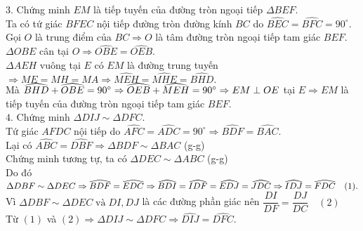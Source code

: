 \begin{ex}
{{{}}
		 \vskip0.1cm\noindent$3.$ Chứng minh $EM$ là tiếp tuyến của đường tròn ngoại tiếp $\Delta BEF.$\\
		 Ta có tứ giác $BFEC$ nội tiếp đường tròn đường kính $BC$ do $\widehat{BEC}=\widehat{BFC}=90^\circ.$\\
		 Gọi $O$ là trung điểm của $BC\Rightarrow O$ là tâm đường tròn ngoại tiếp tam giác $BEF$.\\
		 $\Delta OBE$ cân tại $O\Rightarrow\widehat{OBE}=\widehat{OEB}.$\\
		  $\Delta AEH$ vuông tại $E$ có $EM$ là đường trung tuyến\\
		  $\Rightarrow ME=MH=MA\Rightarrow\widehat{MEH}=\widehat{MHE}=\widehat{BHD}.$\\
		  Mà $\widehat{BHD}+\widehat{OBE}=90^\circ\Rightarrow \widehat{OEB}+\widehat{MEH}=90^\circ\\\Rightarrow EM\perp OE$ tại $E\Rightarrow EM$ là tiếp tuyến của đường tròn ngoại tiếp tam giác $BEF.$ \\
		  \noindent$4.$ Chứng minh $\Delta DIJ\sim \Delta DFC.$\\
		  Tứ giác $AFDC$ nội tiếp do $\widehat{AFC}=\widehat{ADC}=90^\circ\Rightarrow\widehat{BDF}=\widehat{BAC}.$ \\Lại có $\widehat{ABC}=\widehat{DBF}\Rightarrow \Delta BDF\sim \Delta BAC$ (g-g)\\
		  Chứng minh tương tự, ta có $\Delta DEC\sim\Delta ABC$ (g-g)\\
		  Do đó $\Delta DBF\sim \Delta DEC\Rightarrow\widehat{BDF}=\widehat{EDC}\\\Rightarrow\widehat{BDI}=\widehat{IDF}=\widehat{EDJ}=\widehat{JDC}\Rightarrow\widehat{IDJ}=\widehat{FDC}\quad (1).$\\
		  Vì $\Delta DBF\sim \Delta DEC\;
		  \text{và}\; DI,DJ$  là các đường phần giác nên $\dfrac{DI}{DF}=\dfrac{DJ}{DC}\quad (2)$\\
		  Từ $(1)$ và $(2)\Rightarrow \Delta DIJ\sim \Delta DFC\Rightarrow\widehat{DIJ}=\widehat{DFC}.$ 
	 }
\end{ex}
